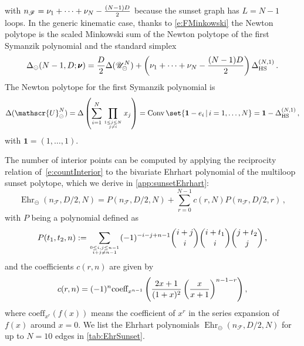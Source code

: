 \documentclass[12pt,a4paper]{article}
\theoremstyle{plain}
\theoremstyle{remark}
\newcommand{\nprops}{N}
\newcommand{\cU}{\mathscr {U}}
\newcommand{\cF}{\mathscr {F}}
\newcommand{\undernotation}[1]{\pmb{#1}}
\newcommand{\Conv}{\operatorname{Conv}}
\newcommand{\Newton}{\Delta}
\DeclareMathOperator{\ehr}{Ehr}
\newcommand{\simplexwithpars}[1]{\Newton_{\text{HS}}^{(#1)}}
\begin{document}
                with
                $n_\cF=\nu_1+\cdots+\nu_{\nprops}-{(\nprops-1)D\over2}$ because the sunset graph has $L=\nprops-1$ loops.              %
In the generic kinematic case, thanks to \cref{e:FMinkowski} the Newton 
polytope is the scaled Minkowski sum of the  Newton polytope of the first Symanzik polynomial and the standard simplex
\begin{equation}\label{e:SunsetPolytope}
  \Delta_{\circleddash}(\nprops-1,D;\undernotation{\nu})={D\over2}\Newton(	\cU^{\nprops}_{\circleddash})+\left(\nu_1+\cdots+\nu_{\nprops}-{(\nprops-1)D\over2}\right)\simplexwithpars{\nprops,1}\,.
\end{equation}
%
The Newton polytope for the first Symanzik polynomial is 
\begin{equation}
  \Newton(\cU_{\circleddash}^{\nprops})=\Newton\left(\sum_{i=1}^\nprops \prod_{1\leq
    j\leq N \atop j\neq i} x_j\right) =  \Conv\set{\mathbf 1-e_i \, | \, i=1, \dots, \nprops} =\mathbf 1-\simplexwithpars{\nprops,1}\,,
    \label{simplex-sunset}
\end{equation}
with $\mathbf 1=(1,\dots,1)$.
\medskip

The number of interior points can be computed by applying
 the reciprocity relation of~\cref{e:countInterior} to the bivariate Ehrhart polynomial of the multiloop sunset polytope, which we derive in \cref{app:sunsetEhrhart}:
\begin{equation}\label{e:EhrSunsetResultMain}
    \ehr_{\circleddash}(n_\cF,D/2,\nprops)=P(n_\cF,D/2,\nprops)+\sum_{r=0}^{\nprops-1} c(r,\nprops) P(n_\cF,D/2,r)\,,
\end{equation}
with $P$ being a polynomial defined as
\begin{equation}
  P(t_1,t_2,n):=  \sum_{0\leq i,j\leq n-1\atop i+j\neq
    n-1}(-1)^{-i-j+n-1} \binom{i+j}{i} \binom{i+t_1}{i} \binom{j+t_2}{j} \,, 
\end{equation}
and the coefficients $c(r,n)$ are given by
\begin{equation}\label{e:EhrSunsetCoeff}
 c(r,n)=(-1)^n \textrm{coeff}_{x^{n-1}}   \left({2 x+1\over (1+x)^2}  \left(\frac{x}{x+1}\right)^{n-1-r}\right),
\end{equation}
where $\textrm{coeff}_{x^{r}}(f(x))$ means the coefficient of
$x^r$ in the series expansion of $f(x)$ around $x=0$.
We list the Ehrhart polynomials $\ehr_{\circleddash}(n_\cF,D/2,N)$ for up to $N=10$ edges in \cref{tab:EhrSunset}.
\end{document}
